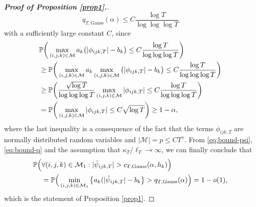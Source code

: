 \documentclass[a4paper,12pt]{article}
\numberwithin{equation}{section}
\begin{document}
{\begin{proof}[\textnormal{\textbf{Proof of Proposition \ref{prop1}.}}]
\begin{equation}\label{eq:bound-q}
q_{T, \text{Gauss}}(\alpha) \leq C \frac{\log T}{\log \log \log T}
\end{equation}
with a sufficiently large constant $C$, since
\begin{align*}
&\mathbb{P} \bigg(\max_{(i,j,k) \in \mathcal{M}} a_k \big( |\phi_{ijk,T}| - b_k \big) \le C \frac{\log T}{\log \log \log T}\bigg)\\
&\ge \mathbb{P} \bigg(\max_{(i,j,k) \in \mathcal{M}} a_k  \max_{(i,j,k) \in \mathcal{M}} \big( |\phi_{ijk,T}| - b_k \big) \le C \frac{\log T}{\log \log \log T}\bigg)\\
&\ge \mathbb{P} \bigg(\frac{\sqrt{\log T}}{\log \log \log T}  \max_{(i,j,k) \in \mathcal{M}} |\phi_{ijk,T}|  \le C \frac{\log T}{\log \log \log T}\bigg)\\
&= \mathbb{P} \bigg(\max_{(i,j,k) \in \mathcal{M}} |\phi_{ijk,T}| \le C \sqrt{\log T}\bigg) \ge 1 - \alpha,
\end{align*}
where the last inequality is a consequence of the fact that the terms $\phi_{ijk, T}$ are normally distributed random variables and $|\mathcal{M}| = p \le C T^\gamma$. From \eqref{eq:bound-psi}, \eqref{eq:bound-q} and the assumption that $\kappa_T/\ell_T \to \infty$, we can finally conclude that
\begin{align*}
\mathbb{P}\Big( & \forall (i,j,k) \in \mathcal{M}_1: |\hat{\psi}_{ijk,T}| > c_{T,\textnormal{Gauss}}(\alpha,h_k) \Big) \\
& = \mathbb{P}\Big( \min_{(i,j,k) \in \mathcal{M}_1} \big\{a_k (|\hat{\psi}_{ijk,T}| - b_k \big\} > q_{T,\textnormal{Gauss}}(\alpha) \Big) = 1 - o(1), 
\end{align*}
which is the statement of Proposition \ref{prop1}.  



\end{proof}}
\end{document}
